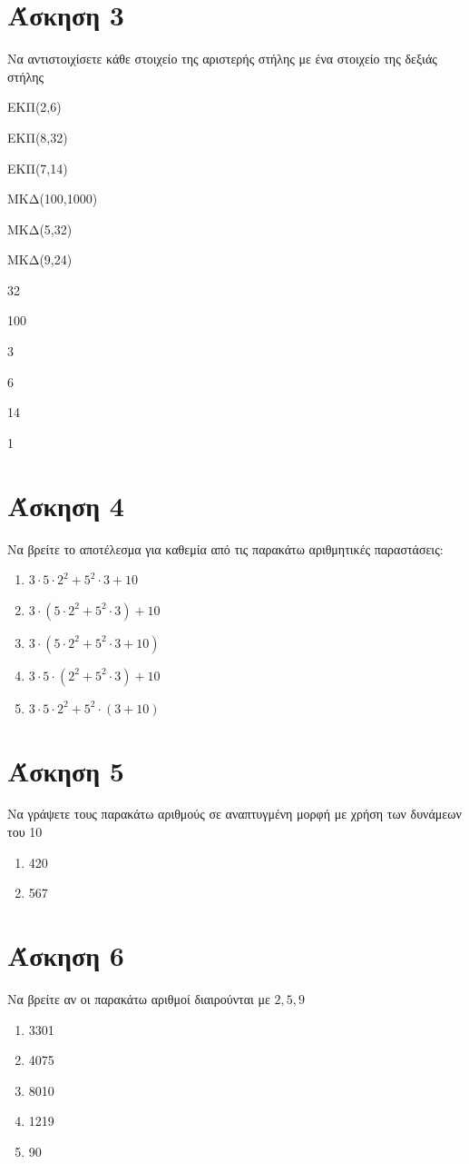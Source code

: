 \documentclass[a4paper,10pt]{report}
\begin{document}
\section*{Άσκηση 3  \hfill \small{}}
Να αντιστοιχίσετε κάθε στοιχείο της αριστερής στήλης με ένα στοιχείο της δεξιάς στήλης
\begin{itemize}
\begin{multicols}{2}
 \item ΕΚΠ(2,6)
 \item ΕΚΠ(8,32)
 \item ΕΚΠ(7,14)
 \item ΜΚΔ(100,1000)
 \item ΜΚΔ(5,32)
 \item ΜΚΔ(9,24)
 \item 32
 \item 100
 \item 3
 \item 6
 \item 14
 \item 1
\end{multicols}
\end{itemize}


\section*{Άσκηση 4  \hfill \small{}}
Να βρείτε το αποτέλεσμα για καθεμία από τις παρακάτω αριθμητικές παραστάσεις:
\begin{enumerate}[1)]
 \item $3\cdot5\cdot2^{2}+5^{2}\cdot3+10$
 \item $3\cdot(5\cdot2^{2}+5^{2}\cdot3)+10$
 \item $3\cdot(5\cdot2^{2}+5^{2}\cdot3+10)$
 \item $3\cdot5\cdot(2^{2}+5^{2}\cdot3)+10$
 \item $3\cdot5\cdot2^{2}+5^{2}\cdot(3+10)$
\end{enumerate}


\section*{Άσκηση 5  \hfill \small{}}
Να γράψετε τους παρακάτω αριθμούς σε αναπτυγμένη μορφή με χρήση των δυνάμεων του 10
\begin{enumerate}[1)]
 \item 420
 \item 567
\end{enumerate}


\section*{Άσκηση 6  \hfill \small{}}
Να βρείτε αν οι παρακάτω αριθμοί διαιρούνται με $2,5,9$
\begin{enumerate}[1)]
 \item 3301
 \item 4075
 \item 8010
 \item 1219
 \item 90
\end{enumerate}
\end{document}
